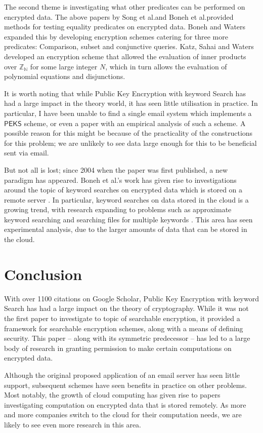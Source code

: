 \documentclass[a4paper,11pt]{article}
\begin{document}
    The second theme is investigating what other predicates can be performed on encrypted data. The above papers by Song et al.\@ and Boneh et al.\@ provided methods for testing equality predicates on encrypted data. Boneh and Waters \cite{boneh:predicate} expanded this by developing encryption schemes catering for three more predicates: Comparison, subset and conjunctive queries. Katz, Sahai and Waters \cite{katz:predicate} developed an encryption scheme that allowed the evaluation of inner products over $\mathbb{Z_N}$ for some large integer $N$, which in turn allows the evaluation of polynomial equations and disjunctions.

    It is worth noting that while Public Key Encryption with keyword Search has had a large impact in the theory world, it has seen little utilisation in practice. In particular, I have been unable to find a single email system which implements a $\mathsf{PEKS}$ scheme, or even a paper with an empirical analysis of such a scheme. A possible reason for this might be because of the practicality of the constructions for this problem; we are unlikely to see data large enough for this to be beneficial sent via email.

    But not all is lost; since 2004 when the paper was first published, a new paradigm has appeared. Boneh et al.'s work has given rise to investigations around the topic of keyword searches on encrypted data which is stored on a remote server \cite{chang:remote}. In particular, keyword searches on data stored in the cloud is a growing trend, with research expanding to problems such as approximate keyword searching \cite{5462196} and searching files for multiple keywords \cite{6674958}. This area has seen experimental analysis, due to the larger amounts of data that can be stored in the cloud.

    \section{Conclusion}

    With over 1100 citations on Google Scholar, Public Key Encryption with keyword Search has had a large impact on the theory of cryptography. While it was not the first paper to investigate to topic of searchable encryption, it provided a framework for searchable encryption schemes, along with a means of defining security. This paper -- along with its symmetric predecessor -- has led to a large body of research in granting permission to make certain computations on encrypted data.

    Although the original proposed application of an email server has seen little support, subsequent schemes have seen benefits in practice on other problems. Most notably, the growth of cloud computing has given rise to papers investigating computation on encrypted data that is stored remotely. As more and more companies switch to the cloud for their computation needs, we are likely to see even more research in this area.

    
\end{document}
